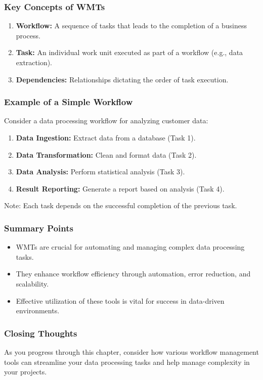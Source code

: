 \documentclass[aspectratio=169]{beamer}
\begin{document}
\begin{frame}[fragile]
    \frametitle{Key Concepts of WMTs}
    \begin{enumerate}
        \item \textbf{Workflow:} A sequence of tasks that leads to the completion of a business process.
        \item \textbf{Task:} An individual work unit executed as part of a workflow (e.g., data extraction).
        \item \textbf{Dependencies:} Relationships dictating the order of task execution.
    \end{enumerate}
\end{frame}

\begin{frame}[fragile]
    \frametitle{Example of a Simple Workflow}
    Consider a data processing workflow for analyzing customer data:
    \begin{enumerate}
        \item \textbf{Data Ingestion:} Extract data from a database (Task 1).
        \item \textbf{Data Transformation:} Clean and format data (Task 2).
        \item \textbf{Data Analysis:} Perform statistical analysis (Task 3).
        \item \textbf{Result Reporting:} Generate a report based on analysis (Task 4).
    \end{enumerate}
    Note: Each task depends on the successful completion of the previous task.
\end{frame}

\begin{frame}[fragile]
    \frametitle{Summary Points}
    \begin{itemize}
        \item WMTs are crucial for automating and managing complex data processing tasks.
        \item They enhance workflow efficiency through automation, error reduction, and scalability.
        \item Effective utilization of these tools is vital for success in data-driven environments.
    \end{itemize}
\end{frame}

\begin{frame}[fragile]
    \frametitle{Closing Thoughts}
    As you progress through this chapter, consider how various workflow management tools can streamline your data processing tasks and help manage complexity in your projects.
\end{frame}
\end{document}
